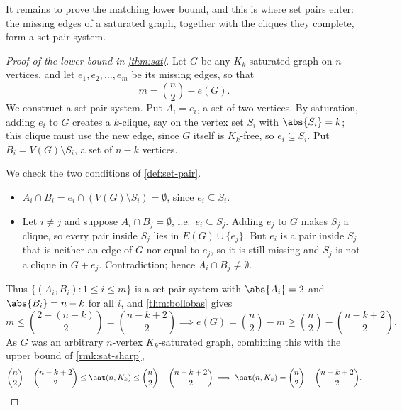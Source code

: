 It remains to prove the matching lower bound, and this is where set pairs enter: the missing edges of a saturated graph, together with the cliques they complete, form a set-pair system.

\begin{proof}[Proof of the lower bound in \autoref{thm:sat}]
    Let \(G\) be any \(K_k\)-saturated graph on \(n\) vertices, and let \(e_1, e_2, \ldots, e_m\) be its missing edges, so that
    \[
        m = \binom{n}{2} - e(G).
    \]
    We construct a set-pair system. Put \(A_i = e_i\), a set of two vertices. By saturation, adding \(e_i\) to \(G\) creates a \(k\)-clique, say on the vertex set \(S_i\) with \(\abs{S_i} = k\); this clique must use the new edge, since \(G\) itself is \(K_k\)-free, so \(e_i \subseteq S_i\). Put \(B_i = V(G) \setminus S_i\), a set of \(n - k\) vertices.
    \begin{center}
    \end{center}
    We check the two conditions of \autoref{def:set-pair}.
    \begin{itemize}
        \item \(A_i \cap B_i = e_i \cap (V(G) \setminus S_i) = \emptyset\), since \(e_i \subseteq S_i\).
        \item Let \(i \ne j\) and suppose \(A_i \cap B_j = \emptyset\), i.e.\ \(e_i \subseteq S_j\). Adding \(e_j\) to \(G\) makes \(S_j\) a clique, so every pair inside \(S_j\) lies in \(E(G) \cup \{e_j\}\). But \(e_i\) is a pair inside \(S_j\) that is neither an edge of \(G\) nor equal to \(e_j\), so it is still missing and \(S_j\) is not a clique in \(G + e_j\). Contradiction; hence \(A_i \cap B_j \ne \emptyset\).
    \end{itemize}
    Thus \(\{(A_i, B_i) : 1 \le i \le m\}\) is a set-pair system with \(\abs{A_i} = 2\) and \(\abs{B_i} = n - k\) for all \(i\), and \autoref{thm:bollobas} gives
    \[
        m \le \binom{2 + (n - k)}{2} = \binom{n-k+2}{2}
        \implies e(G) = \binom{n}{2} - m \ge \binom{n}{2} - \binom{n-k+2}{2}.
    \]
    As \(G\) was an arbitrary \(n\)-vertex \(K_k\)-saturated graph, combining this with the upper bound of \autoref{rmk:sat-sharp},
    \[
        \binom{n}{2} - \binom{n-k+2}{2} \le \sat(n, K_k) \le \binom{n}{2} - \binom{n-k+2}{2}
        \implies \sat(n, K_k) = \binom{n}{2} - \binom{n-k+2}{2}. \qedhere
    \]
\end{proof}

